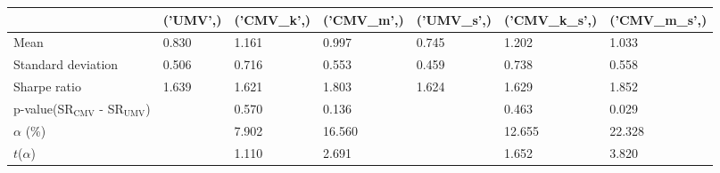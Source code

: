 \begin{tabular}{lllllll}
\toprule
 & ('UMV',) & ('CMV_k',) & ('CMV_m',) & ('UMV_s',) & ('CMV_k_s',) & ('CMV_m_s',) \\
\midrule
Mean & 0.830 & 1.161 & 0.997 & 0.745 & 1.202 & 1.033 \\
Standard deviation & 0.506 & 0.716 & 0.553 & 0.459 & 0.738 & 0.558 \\
Sharpe ratio & 1.639 & 1.621 & 1.803 & 1.624 & 1.629 & 1.852 \\
p-value(SR$_{\text{CMV}}$ - SR$_{\text{UMV}}$) &  & 0.570 & 0.136 &  & 0.463 & 0.029 \\
$\alpha$ (\%) &  & 7.902 & 16.560 &  & 12.655 & 22.328 \\
$t$($\alpha$) &  & 1.110 & 2.691 &  & 1.652 & 3.820 \\
\bottomrule
\end{tabular}
